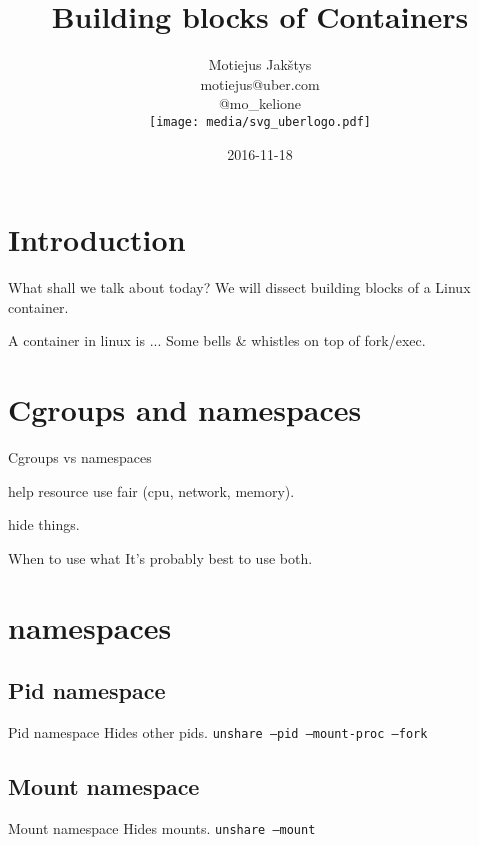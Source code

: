 \documentclass[14pt]{beamer}
\title{Building blocks of Containers}
\author{Motiejus Jak\v{s}tys \\
    motiejus@uber.com \\
    @mo\_kelione \\
    \vspace{1em}
    \texttt{[image: media/svg\_uberlogo.pdf]}
}
\date{2016-11-18}
\begin{document}

\begin{frame}
\titlepage
\end{frame}

\section{Introduction}
\begin{frame}{What shall we talk about today?}
    We will dissect building blocks of a Linux container.
\end{frame}

\begin{frame}{A container in linux is ...}
    Some bells \& whistles on top of fork/exec.
\end{frame}

\section{Cgroups and namespaces}
\begin{frame}{Cgroups vs namespaces}
    \begin{description}[<+->]
        \item[cgroups] help resource use fair (cpu, network, memory).
        \item[namespaces] hide things.
    \end{description}
\end{frame}

\begin{frame}{When to use what}
    It's probably best to use both.
\end{frame}

\section{namespaces}
\subsection{Pid namespace}
\begin{frame}{Pid namespace}
    Hides other pids.
    {
        \tt unshare --pid --mount-proc --fork
    }
\end{frame}

\subsection{Mount namespace}
\begin{frame}{Mount namespace}
    Hides mounts.
    {
        \tt unshare --mount
    }
\end{frame}
\end{document}
